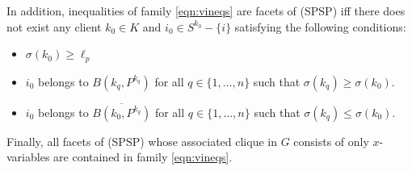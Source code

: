 \begin{theorem}
    In addition, inequalities of family \eqref{eqn:vineqs} are facets of
    \rm{(SPSP)} iff there does not exist any client $k_0 \in K$ and $i_0 \in
    S^{k_0} - \{i\}$ satisfying the following conditions:
    \begin{itemize}
        \item %
            $\sigma(k_0) \geq \ell_p$
        \item %
	    $i_0$ belongs to $B(k_q, P^{k_q})$ for all $q \in \{1, \ldots, n\}$
	    such that $\sigma(k_q) \geq \sigma(k_0)$.
        \item %
	    $i_0$ belongs to $\overline{B(k_0, P^{k_q})}$ for all $q \in \{1,
	    \ldots, n\}$ such that $\sigma(k_q) \leq \sigma(k_0)$.
    \end{itemize}
    \noindent
    Finally, all facets of \rm{(SPSP)} whose associated clique in $G$ consists
    of only $x$-variables are contained in family \eqref{eqn:vineqs}.
\end{theorem}

